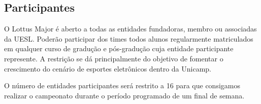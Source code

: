 \subsection{Participantes}

O Lottus Major é aberto a todas as entidades fundadoras, membro ou associadas da UESL. Poderão participar dos times todos alunos regularmente matriculados em qualquer curso de gradução e pós-gradução cuja entidade participante represente. A restrição se dá principalmente do objetivo de fomentar o crescimento do cenário de esportes eletrônicos dentro da Unicamp.

O número de entidades participantes será restrito a 16 para que consigamos realizar o campeonato durante o período programado de um final de semana.
